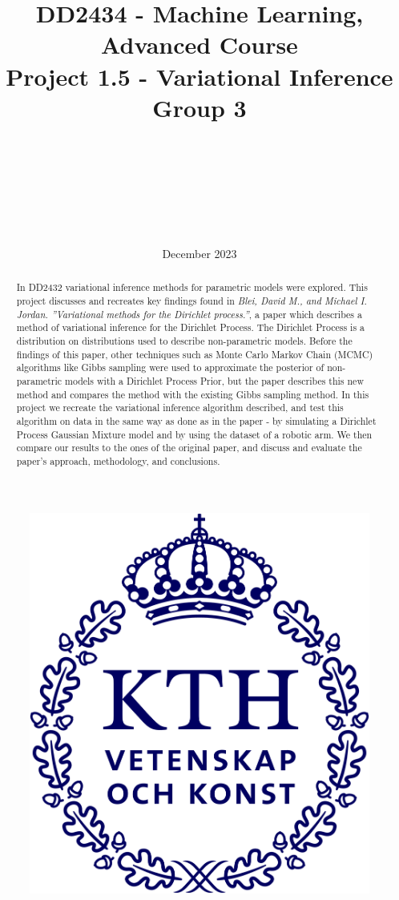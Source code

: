 \documentclass{article}
\title{DD2434 - Machine Learning, Advanced Course \\ Project 1.5 - Variational Inference \\ Group 3}
\author{\authorFst \\ \emailFst \and \authorSnd \\ \emailSnd \and \authorTrd \\ \emailTrd \and \authorFrth \\ \emailFrth}
\date{December 2023}
\begin{document}
\maketitle

\begin{abstract}

In DD2432 variational inference methods for parametric models were explored. This project discusses and recreates key findings found in \emph{Blei, David M., and Michael I. Jordan. ”Variational methods for the Dirichlet process.”}, a paper which describes a method of variational inference for the Dirichlet Process. The Dirichlet Process is a distribution on distributions used to describe non-parametric models. Before the findings of this paper, other techniques such as Monte Carlo Markov Chain (MCMC) algorithms like Gibbs sampling were used to approximate the posterior of non-parametric models with a Dirichlet Process Prior, but the paper describes this new method and compares the method with the existing Gibbs sampling method. In this project we recreate the variational inference algorithm described, and test this algorithm on data in the same way as done as in the paper - by simulating a Dirichlet Process Gaussian Mixture model and by using the dataset of a robotic arm. We then compare our results to the ones of the original paper, and discuss and evaluate the paper's approach, methodology, and conclusions.
\end{abstract}

\begin{figure}[h]
    \centering
    \includegraphics[scale=0.2]{KTH_logo_RGB_bla.png}
\end{figure}
\end{document}
